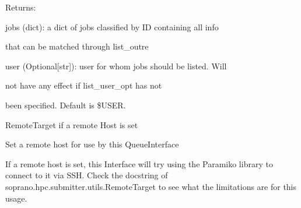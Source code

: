 \documentclass[letterpaper,10pt,english]{sphinxmanual}
\begin{document}
\begin{fulllineitems}
\begin{fulllineitems}
\begin{DUlineblock}{0em}
\item[] Returns:
\item[]
\begin{DUlineblock}{\DUlineblockindent}
\item[] jobs (dict): a dict of jobs classified by ID containing all info
\item[]
\begin{DUlineblock}{\DUlineblockindent}
\item[] that can be matched through list\_outre
\end{DUlineblock}
\item[] user (Optional{[}str{]}): user for whom jobs should be listed. Will
\item[]
\begin{DUlineblock}{\DUlineblockindent}
\item[] not have any effect if list\_user\_opt has not
\item[] been specified. Default is \$USER.
\item[] 
\end{DUlineblock}
\end{DUlineblock}
\end{DUlineblock}

\end{fulllineitems}


\begin{fulllineitems}
\label{doctree/soprano.hpc.submitter.queues:soprano.hpc.submitter.queues.QueueInterface.remote_target}
RemoteTarget if a remote Host is set

\end{fulllineitems}


\begin{fulllineitems}
\label{doctree/soprano.hpc.submitter.queues:soprano.hpc.submitter.queues.QueueInterface.set_remote_host}
Set a remote host for use by this QueueInterface

If a remote host is set, this Interface will try using the Paramiko
library to connect to it via SSH. Check the docstring of 
soprano.hpc.submitter.utils.RemoteTarget to see what the limitations
are for this usage.


\end{fulllineitems}
\end{fulllineitems}
\end{document}
